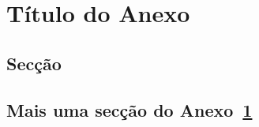 
\chapter{Título do Anexo} %
\label{AppendixA} %

\section{Secção}

\lipsum[1]

\section{Mais uma secção do Anexo~\ref{AppendixA}}

\lipsum[1]

